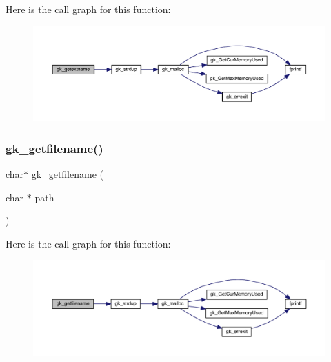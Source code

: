 Here is the call graph for this function\+:\nopagebreak
\begin{figure}[H]
\begin{center}
\leavevmode
\includegraphics[width=350pt]{a00077_a4d728cd9869792eb93b315f949819d99_cgraph}
\end{center}
\end{figure}
\mbox{\label{a00077_a742e52c08aa7e46acd66cde95045d935}} 
\subsubsection{\texorpdfstring{gk\+\_\+getfilename()}{gk\_getfilename()}}
{\footnotesize\ttfamily char$\ast$ gk\+\_\+getfilename (\begin{DoxyParamCaption}\item[{char $\ast$}]{path }\end{DoxyParamCaption})}

Here is the call graph for this function\+:\nopagebreak
\begin{figure}[H]
\begin{center}
\leavevmode
\includegraphics[width=350pt]{a00077_a742e52c08aa7e46acd66cde95045d935_cgraph}
\end{center}
\end{figure}
\mbox{\label{a00077_a739112cb142f2e96d6952140c66cd31c}} 
